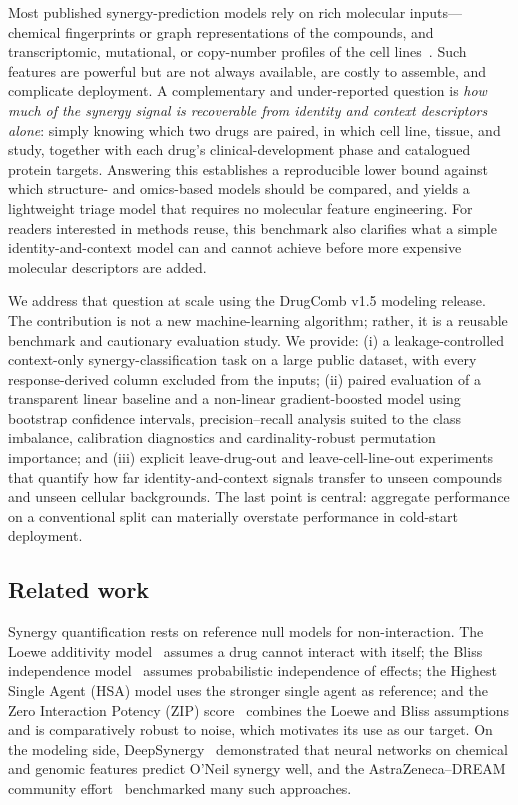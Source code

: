 \documentclass{bmcart}
\begin{document}
Most published synergy-prediction models rely on rich molecular inputs---chemical fingerprints or
graph representations of the compounds, and transcriptomic, mutational, or copy-number profiles of the
cell lines~\cite{preuer2018,menden2019}. Such features are powerful but are not always available, are
costly to assemble, and complicate deployment. A complementary and under-reported question is
\emph{how much of the synergy signal is recoverable from identity and context descriptors alone}:
simply knowing which two drugs are paired, in which cell line, tissue, and study, together with each
drug's clinical-development phase and catalogued protein targets. Answering this establishes a
reproducible lower bound against which structure- and omics-based models should be compared, and
yields a lightweight triage model that requires no molecular feature engineering. For readers
interested in methods reuse, this benchmark also clarifies what a simple identity-and-context
model can and cannot achieve before more expensive molecular descriptors are added.

We address that question at scale using the DrugComb v1.5 modeling release. The contribution is not a
new machine-learning algorithm; rather, it is a reusable benchmark and cautionary evaluation study. We
provide: (i) a leakage-controlled context-only synergy-classification task on a large public dataset,
with every response-derived column excluded from the inputs; (ii) paired evaluation of a transparent
linear baseline and a non-linear gradient-boosted model using bootstrap confidence intervals,
precision--recall analysis suited to the class imbalance, calibration diagnostics and
cardinality-robust permutation importance; and (iii) explicit leave-drug-out and leave-cell-line-out
experiments that quantify how far identity-and-context signals transfer to unseen compounds and
unseen cellular backgrounds. The last point is central: aggregate performance on a conventional split
can materially overstate performance in cold-start deployment.

\subsection*{Related work}
Synergy quantification rests on reference null models for non-interaction. The Loewe additivity
model~\cite{loewe1953} assumes a drug cannot interact with itself; the Bliss independence
model~\cite{bliss1939} assumes probabilistic independence of effects; the Highest Single Agent (HSA)
model uses the stronger single agent as reference; and the Zero Interaction Potency (ZIP)
score~\cite{yadav2015} combines the Loewe and Bliss assumptions and is comparatively robust to noise,
which motivates its use as our target. On the modeling side, DeepSynergy~\cite{preuer2018} demonstrated
that neural networks on chemical and genomic features predict O'Neil synergy well, and the
AstraZeneca--DREAM community effort~\cite{menden2019} benchmarked many such approaches.
\end{document}
